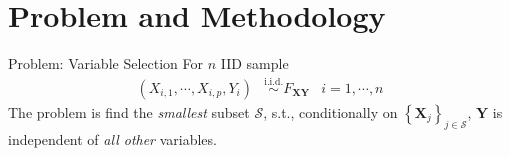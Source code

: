 \section{Problem and Methodology}
    
    \frame{\sectionpage}

    \begin{frame}{Problem: Variable Selection}
    For $n$ IID sample
        \begin{align*}
            \left( X_{i,1},\cdots,X_{i,p},Y_i \right) &\overset{\text{i.i.d.}}{\sim} F_{\mathbf{XY}} & i=1,\cdots,n
        \end{align*}
    The problem is find the \textcolor{glaucous!65!white}{\textit{smallest}} subset $\mathcal{S}$, s.t., conditionally on $\left\{ \mathbf{X}_j \right\}_{j\in\mathcal{S}}$, $\mathbf{Y}$ is independent of \textcolor{glaucous!65!white}{\textit{all other}} variables.

    \end{frame}

